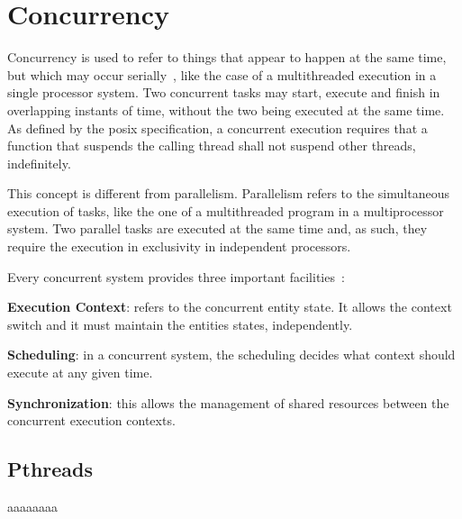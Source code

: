 %
\section{Concurrency}%
\label{sec:concurrency}
Concurrency is used to refer to things that appear to happen at the same time,
but which may occur serially~\cite{buttlar1996pthreads}, like the case of a
multithreaded execution in a single processor system.
Two concurrent tasks may start, execute and finish in overlapping instants of
time, without the two being executed at the same time.
As defined by the \gls{posix} specification, a concurrent execution requires that a function that
suspends the calling thread shall not suspend other threads, indefinitely.

This concept is different from parallelism. Parallelism refers to the
simultaneous execution of tasks, like the one of a multithreaded program in a
multiprocessor system.
Two parallel tasks are executed at the same time and, as such, they require
the execution in exclusivity in independent processors.

Every concurrent system provides three important facilities~\cite{buttlar1996pthreads}:
\begin{item-c}
\item \textbf{Execution Context}: refers to the concurrent entity state. It
  allows the context switch and it must maintain the entities states,
  independently.
\item \textbf{Scheduling}: in a concurrent system, the scheduling decides what
  context should execute at any given time.
\item \textbf{Synchronization}: this allows the management of shared resources
  between the concurrent execution contexts.
\end{item-c}

\subsection{Pthreads}
\label{sec:pthreads}
aaaaaaaa





